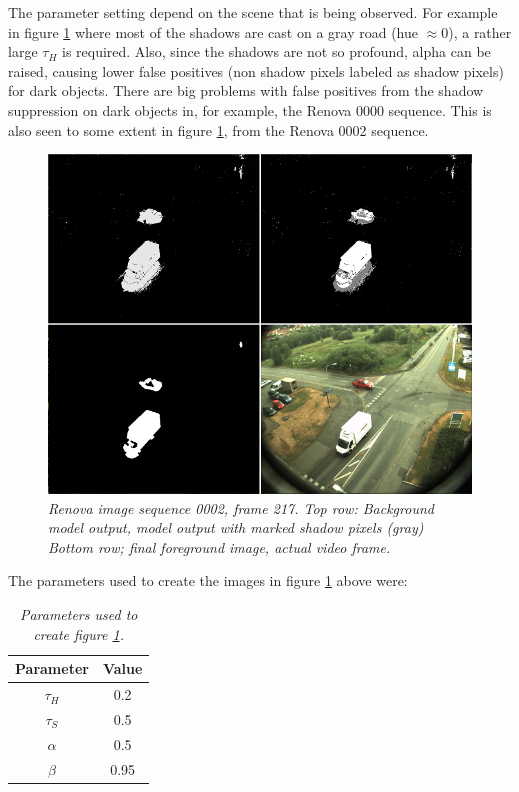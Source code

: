 The parameter setting depend on the scene that is being observed. For example in figure \ref{fig:shadow_suppression_fig} where most of the shadows are cast on a gray road (hue $\approx 0$), a rather large $\tau_H$ is required. Also, since the shadows are not so profound, alpha can be raised, causing lower false positives (non shadow pixels labeled as shadow pixels) for dark objects. There are big problems with false positives from the shadow suppression on dark objects in, for example, the Renova 0000 sequence. This is also seen to some extent in figure \ref{fig:shadow_suppression_fig}, from the Renova 0002 sequence.

\newpage
\begin{figure}[htb]
	\centering
	\includegraphics[width=\linewidth]{images/ShadowRenova0002.png}
	\caption{\textit{Renova image sequence 0002, frame 217. 
	\newline
	Top row: Background model output, model output with marked shadow pixels (gray) \newline
	Bottom row; final foreground image, actual video frame.}}
	\label{fig:shadow_suppression_fig}  %
\end{figure}

The parameters used to create the images in figure \ref{fig:shadow_suppression_fig} above were:

\begin{table}[htb]
\centering
\begin{tabular}{|c|c|}
	\hline
	Parameter & Value  \\
	\hline
	$\tau_H$ &  0.2 \\
	\hline
	$\tau_S$ & 0.5 \\
	\hline
	$\alpha$ &  0.5 \\
	\hline
	$\beta$ &  0.95 \\
	\hline
\end{tabular}

\caption{\textit{Parameters used to create figure \ref{fig:shadow_suppression_fig}.}}
\label{tab:shadow_parameters}
\end{table}